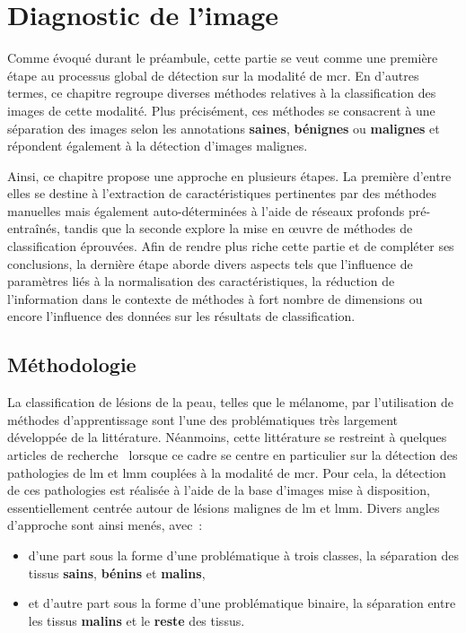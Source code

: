 \renewcommand{\thechapter}{\arabic{chapter}}
\setcounter{chapter}{4}

\chapter{Diagnostic de l'image}
\label{chap:chapter_5}
\chapterintro
Comme évoqué durant le préambule, cette partie se veut comme une première étape au processus global de détection sur la modalité de \gls{mcr}. En d'autres termes, ce chapitre regroupe diverses méthodes relatives à la classification des images de cette modalité. Plus précisément, ces méthodes se consacrent à une séparation des images selon les annotations \textbf{saines}, \textbf{bénignes} ou \textbf{malignes} et répondent également à la détection d'images malignes.\par

Ainsi, ce chapitre propose une approche en plusieurs étapes. La première d'entre elles se destine à l'extraction de caractéristiques pertinentes par des méthodes manuelles mais également auto-déterminées à l'aide de réseaux profonds pré-entraînés, tandis que la seconde explore la mise en œuvre de méthodes de classification éprouvées. Afin de rendre plus riche cette partie et de compléter ses conclusions, la dernière étape aborde divers aspects tels que l'influence de paramètres liés à la normalisation des caractéristiques, la réduction de l'information dans le contexte de méthodes à fort nombre de dimensions ou encore l'influence des données sur les résultats de classification.\par	
\newpage

\section{Méthodologie}
La classification de lésions de la peau, telles que le mélanome, par l'utilisation de méthodes d'apprentissage sont l'une des problématiques très largement développée de la littérature. Néanmoins, cette littérature se restreint à quelques articles de recherche~\cite{Halimi2017a, Halimi2017b, Wiltgen2008, Koller2010} lorsque ce cadre se centre en particulier sur la détection des pathologies de \gls{lm} et \gls{lmm} couplées à la modalité de \gls{mcr}. Pour cela, la détection de ces pathologies est réalisée à l'aide de la base d'images mise à disposition, essentiellement centrée autour de lésions malignes de \gls{lm} et \gls{lmm}. Divers angles d'approche sont ainsi menés, avec~:~
\begin{itemize}
    \item d'une part sous la forme d'une problématique à trois classes, la séparation des tissus \textbf{sains}, \textbf{bénins} et \textbf{malins},
    \item et d'autre part sous la forme d'une problématique binaire, la séparation entre les tissus \textbf{malins} et le \textbf{reste} des tissus.
\end{itemize}\par

